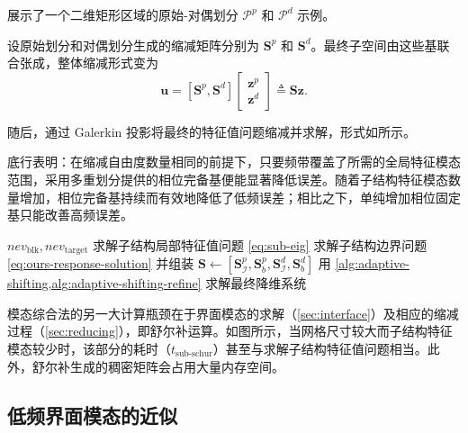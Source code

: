 展示了一个二维矩形区域的原始-对偶划分 $\mathcal{P}^p$ 和 $\mathcal{P}^d$ 示例。

设原始划分和对偶划分生成的缩减矩阵分别为 $\mathbf{S}^p$ 和 $\mathbf{S}^d$。最终子空间由这些基联合张成，整体缩减形式变为
\begin{equation}
  \mathbf{u}= [\mathbf{S}^p, \mathbf{S}^d]
  \begin{bmatrix}
    \mathbf{z}^{p} \\
    \mathbf{z}^{d}
  \end{bmatrix}
  \triangleq \mathbf{S} \mathbf{z}.
    \label{eq:pd-subspace}
\end{equation}

随后，通过 Galerkin 投影将最终的特征值问题缩减并求解，形式如所示。

 底行表明：在缩减自由度数量相同的前提下，只要频带覆盖了所需的全局特征模态范围，采用多重划分提供的相位完备基便能显著降低误差。随着子结构特征模态数量增加，相位完备基持续而有效地降低了低频误差；相比之下，单纯增加相位固定基只能改善高频误差。

\begin{algorithm}[t]
  \caption{多重划分模态综合法}
  \label{alg:pd-cms}
  \begin{algorithmic}[1]
    \REQUIRE $nev_{\text{blk}},nev_{\text{target}}$
    \STATE {}
      \STATE 求解子结构局部特征值问题 \cref{eq:sub-eig}
    \ENDFOR
    \STATE {}
      \STATE 求解子结构边界问题 \cref{eq:ours-response-solution} 并组装
    \ENDFOR
    \STATE $\mathbf{S} \leftarrow [\mathbf{S}^p_\mathcal{I},\mathbf{S}^p_b,\mathbf{S}_{\mathcal{I}}^d,\mathbf{S}_b^d]$
    \STATE 用 \cref{alg:adaptive-shifting,alg:adaptive-shifting-refine} 求解最终降维系统
  \end{algorithmic}
\end{algorithm}

模态综合法的另一大计算瓶颈在于界面模态的求解（\cref{sec:interface}）及相应的缩减过程（\cref{sec:reducing}），即舒尔补运算。如图所示，当网格尺寸较大而子结构特征模态较少时，该部分的耗时（$t_{\text{sub-schur}}$）甚至与求解子结构特征值问题相当。此外，舒尔补生成的稠密矩阵会占用大量内存空间。

\subsection{低频界面模态的近似}\label{subsec:approx-interface-modes}


